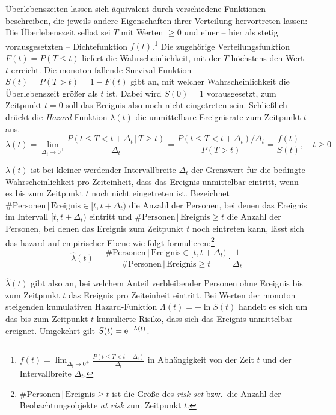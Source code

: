 Überlebenszeiten lassen sich äquivalent durch verschiedene Funktionen beschreiben, die jeweils andere Eigenschaften ihrer Verteilung hervortreten lassen: Die Überlebenszeit selbst sei $T$ mit Werten $\geq 0$ und einer -- hier als stetig vorausgesetzten -- Dichtefunktion $f(t)$.\footnote{$f(t) = \lim_{\Delta_{t} \to 0^{+}} \frac{P(t \leq T < t + \Delta_{t})}{\Delta_{t}}$ in Abhängigkeit von der Zeit $t$ und der Intervallbreite $\Delta_{t}$.} Die zugehörige Verteilungsfunktion $F(t) = P(T \leq t)$ liefert die Wahrscheinlichkeit, mit der $T$ höchstens den Wert $t$ erreicht. Die monoton fallende Survival-Funktion $S(t) = P(T > t) = 1-F(t)$ gibt an, mit welcher Wahrscheinlichkeit die Überlebenszeit größer als $t$ ist. Dabei wird $S(0) = 1$ vorausgesetzt, zum Zeitpunkt $t = 0$ soll das Ereignis also noch nicht eingetreten sein. Schließlich drückt die \emph{Hazard}-Funktion $\lambda(t)$ die unmittelbare Ereignisrate zum Zeitpunkt $t$ aus.
\begin{equation*}
\lambda(t) = \lim_{\Delta_{t} \to 0^{+}} \frac{P(t \leq T < t + \Delta_{t} \, | \, T \geq t)}{\Delta_{t}} = \frac{P(t \leq T < t + \Delta_{t}) / \Delta_{t}}{P(T > t)} = \frac{f(t)}{S(t)}, \quad t \geq 0
\end{equation*}

$\lambda(t)$ ist bei kleiner werdender Intervallbreite $\Delta_{t}$ der Grenzwert für die bedingte Wahrscheinlichkeit pro Zeiteinheit, dass das Ereignis unmittelbar eintritt, wenn es bis zum Zeitpunkt $t$ noch nicht eingetreten ist. Bezeichnet $\# \text{Personen} \, | \, \text{Ereignis} \in [t, t + \Delta_{t})$ die Anzahl der Personen, bei denen das Ereignis im Intervall $[t, t + \Delta_{t})$ eintritt und $\# \text{Personen} \, | \, \text{Ereignis} \geq t$ die Anzahl der Personen, bei denen das Ereignis zum Zeitpunkt $t$ noch eintreten kann, lässt sich das hazard auf empirischer Ebene wie folgt formulieren:\footnote{$\# \text{Personen} \, | \, \text{Ereignis} \geq t$ ist die Größe des \emph{risk set} bzw.\ die Anzahl der Beobachtungsobjekte \emph{at risk} zum Zeitpunkt $t$.}
\begin{equation*}
\hat{\lambda}(t) = \frac{\# \text{Personen} \, | \, \text{Ereignis} \in [t, t+\Delta_{t})}{\# \text{Personen} \, | \, \text{Ereignis} \geq t} \cdot \frac{1}{\Delta_{t}}
\end{equation*}

$\hat{\lambda}(t)$ gibt also an, bei welchem Anteil verbleibender Personen ohne Ereignis bis zum Zeitpunkt $t$ das Ereignis pro Zeiteinheit eintritt. Bei Werten der monoton steigenden kumulativen Hazard-Funktion $\Lambda(t) = -\ln S(t)$ handelt es sich um das bis zum Zeitpunkt $t$ kumulierte Risiko, dass sich das Ereignis unmittelbar ereignet. Umgekehrt gilt $S(t) = {\mathrm{e}}^{-\Lambda(t)}$.

